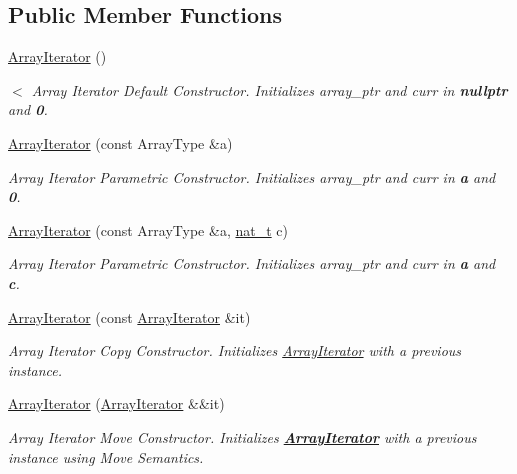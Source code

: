\subsection*{Public Member Functions}
\begin{DoxyCompactItemize}
\item 
\hyperlink{class_designar_1_1_array_iterator_a0fd19f5e2f3f3c13470d62b118575582}{Array\+Iterator} ()
\begin{DoxyCompactList}\small\item\em $<$ Array Iterator Default Constructor. Initializes {\itshape array\+\_\+ptr} and {\itshape curr} in {\bfseries nullptr} and {\bfseries 0}. \end{DoxyCompactList}\item 
\hyperlink{class_designar_1_1_array_iterator_a7d5565949d8cd3100686c1ff73eb1618}{Array\+Iterator} (const Array\+Type \&a)
\begin{DoxyCompactList}\small\item\em Array Iterator Parametric Constructor. Initializes {\itshape array\+\_\+ptr} and {\itshape curr} in {\bfseries a} and {\bfseries 0}. \end{DoxyCompactList}\item 
\hyperlink{class_designar_1_1_array_iterator_a1c9df0412f7bb1dabbd15f6772d8b9a3}{Array\+Iterator} (const Array\+Type \&a, \hyperlink{namespace_designar_aa72662848b9f4815e7bf31a7cf3e33d1}{nat\+\_\+t} c)
\begin{DoxyCompactList}\small\item\em Array Iterator Parametric Constructor. Initializes {\itshape array\+\_\+ptr} and {\itshape curr} in {\bfseries a} and {\bfseries c}. \end{DoxyCompactList}\item 
\hyperlink{class_designar_1_1_array_iterator_a7d3069da40d921310097dbde17fb0204}{Array\+Iterator} (const \hyperlink{class_designar_1_1_array_iterator}{Array\+Iterator} \&it)
\begin{DoxyCompactList}\small\item\em Array Iterator Copy Constructor. Initializes \hyperlink{class_designar_1_1_array_iterator}{Array\+Iterator} with a previous instance. \end{DoxyCompactList}\item 
\hyperlink{class_designar_1_1_array_iterator_ad27f115766207137bd74ef47d477f4f5}{Array\+Iterator} (\hyperlink{class_designar_1_1_array_iterator}{Array\+Iterator} \&\&it)
\begin{DoxyCompactList}\small\item\em Array Iterator Move Constructor. Initializes {\bfseries \hyperlink{class_designar_1_1_array_iterator}{Array\+Iterator}} with a previous instance using Move Semantics. \end{DoxyCompactList}\item 

\end{DoxyCompactItemize}
